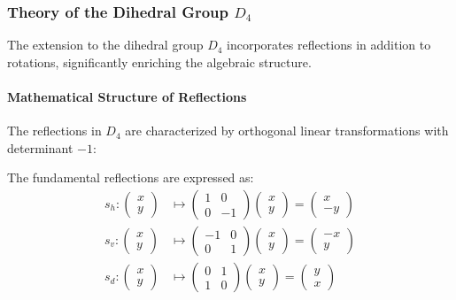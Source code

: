 \subsubsection{Theory of the Dihedral Group $D_4$}

The extension to the dihedral group $D_4$ incorporates reflections in addition to rotations, significantly enriching the algebraic structure.

\paragraph{Mathematical Structure of Reflections}

The reflections in $D_4$ are characterized by orthogonal linear transformations with determinant $-1$:

\begin{definition}
The fundamental reflections are expressed as:
\begin{align}
s_h: \begin{pmatrix} x \\ y \end{pmatrix} &\mapsto \begin{pmatrix} 1 & 0 \\ 0 & -1 \end{pmatrix} \begin{pmatrix} x \\ y \end{pmatrix} = \begin{pmatrix} x \\ -y \end{pmatrix} \\
s_v: \begin{pmatrix} x \\ y \end{pmatrix} &\mapsto \begin{pmatrix} -1 & 0 \\ 0 & 1 \end{pmatrix} \begin{pmatrix} x \\ y \end{pmatrix} = \begin{pmatrix} -x \\ y \end{pmatrix} \\
s_d: \begin{pmatrix} x \\ y \end{pmatrix} &\mapsto \begin{pmatrix} 0 & 1 \\ 1 & 0 \end{pmatrix} \begin{pmatrix} x \\ y \end{pmatrix} = \begin{pmatrix} y \\ x \end{pmatrix}
\end{align}
\end{definition}

